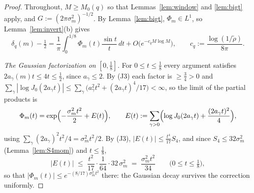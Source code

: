 \documentclass[11pt]{article}
\begin{document}
\begin{proof}
Throughout, $M\ge M_0(q)$ so that Lemmas~\ref{lem:window} and
\ref{lem:bigt} apply, and $G:=(2\pi\sigma_m^2)^{-1/2}$. By
Lemma~\ref{lem:bigt}, $\Phi_m\in L^1$, so Lemma~\ref{lem:invert}(b)
gives
\begin{equation}\label{eq:GP}
\delta_q(m)-\tfrac12
=\frac1\pi\int_0^{1/8}\Phi_m(t)\frac{\sin t}t\,dt
+O\bigl(e^{-c_qM\log M}\bigr),
\qquad c_q:=\frac{\log(1/\tilde\rho)}{8\pi}.
\end{equation}

\emph{The Gaussian factorization on $[0,\tfrac18]$.} For
$0\le t\le\tfrac18$ every argument satisfies
$2a_\gamma(m)t\le4t\le\tfrac12$, since $a_\gamma\le2$. By (J3) each
factor is $\ge\tfrac34>0$ and
$\sum_\gamma|\log J_0(2a_\gamma t)|\le\sum_\gamma\bigl(a_\gamma^2t^2
+(2a_\gamma t)^4/17\bigr)<\infty$, so the limit of the partial
products is
\begin{equation}\label{eq:smallt}
\Phi_m(t)=\exp\Bigl(-\frac{\sigma_m^2t^2}{2}+E(t)\Bigr),
\qquad
E(t):=\sum_{\gamma>0}\Bigl(\log J_0(2a_\gamma t)
+\frac{(2a_\gamma t)^2}{4}\Bigr),
\end{equation}
using $\sum_\gamma(2a_\gamma)^2t^2/4=\sigma_m^2t^2/2$. By (J3),
$|E(t)|\le\tfrac{t^4}{17}S_4$, and since $S_4\le32\sigma_m^2$
(Lemma~\ref{lem:S4mom}) and $t\le\tfrac18$,
\begin{equation}\label{eq:Eunif}
|E(t)|\;\le\;\frac{t^2}{17}\cdot\frac{1}{64}\cdot32\,\sigma_m^2
\;=\;\frac{\sigma_m^2t^2}{34}
\qquad\bigl(0\le t\le\tfrac18\bigr),
\end{equation}
so that $|\Phi_m(t)|\le e^{-(8/17)\sigma_m^2t^2}$ there: the Gaussian
decay survives the correction uniformly.


\end{proof}
\end{document}
